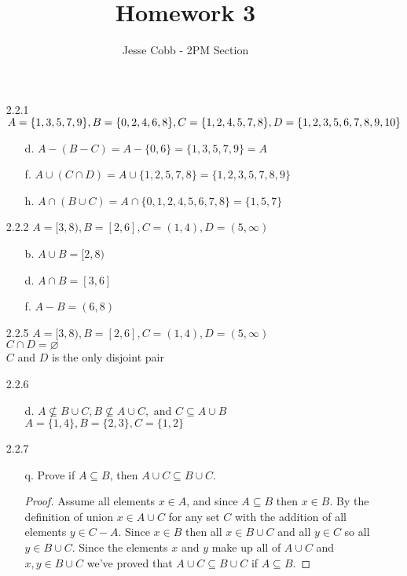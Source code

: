 \documentclass[11pt]{amsart}
\theoremstyle{definition}
\begin{document}
\title{Homework 3}

\author{Jesse Cobb - 2PM Section}

\maketitle

\begin{itemize}

\item[2.2.1] $A=\{1,3,5,7,9\}, B=\{0,2,4,6,8\},\\ C=\{1,2,4,5,7,8\}, D=\{1,2,3,5,6,7,8,9,10\}$
\begin{itemize}
    \item[d.] $A-(B-C)=A-\{0,6\}=\{1,3,5,7,9\}=A$

    \item[f.] $A\cup(C\cap D)=A\cup \{1,2,5,7,8\}=\{1,2,3,5,7,8,9\}$

    \item[h.] $A\cap (B\cup C)=A\cap \{0,1,2,4,5,6,7,8\}=\{1,5,7\}$
    
\end{itemize}

\item[2.2.2] $A=[3,8),B=[2,6],C=(1,4),D=(5,\infty)$
\begin{itemize}
    \item[b.] $A\cup B=[2,8)$

    \item[d.] $A\cap B=[3,6]$

    \item[f.] $A-B=(6,8)$
    
\end{itemize}

\item[2.2.5] $A=[3,8),B=[2,6],C=(1,4),D=(5,\infty)$\\
             $C\cap D=\varnothing$\\
             $C$ and $D$ is the only disjoint pair

\item[2.2.6]
\begin{itemize}
    \item[d.] $A\nsubseteq B\cup C, B\nsubseteq A\cup C,\text{ and }C\subseteq A\cup B$ \\
              $A=\{1,4\}, B=\{2,3\},C=\{1,2\}$

\end{itemize}

\item[2.2.7]
\begin{itemize}
    \item[q.] Prove if $A\subseteq B$, then $A\cup C\subseteq B\cup C$.
    \begin{proof}
        Assume all elements $x\in A$, and since $A\subseteq B$ then $x\in B$. By the definition of union $x\in A\cup C$ for any set $C$ with the addition of all elements $y\in C-A$. Since $x\in B$ then all $x\in B\cup C$ and all $y\in C$ so all $y\in B\cup C$. Since the elements $x$ and $y$ make up all of $A\cup C$ and $x,y\in B\cup C$ we've proved that  $A\cup C\subseteq B\cup C$ if $A\subseteq B$.
    \end{proof}


\end{itemize}
\end{itemize}
\end{document}

